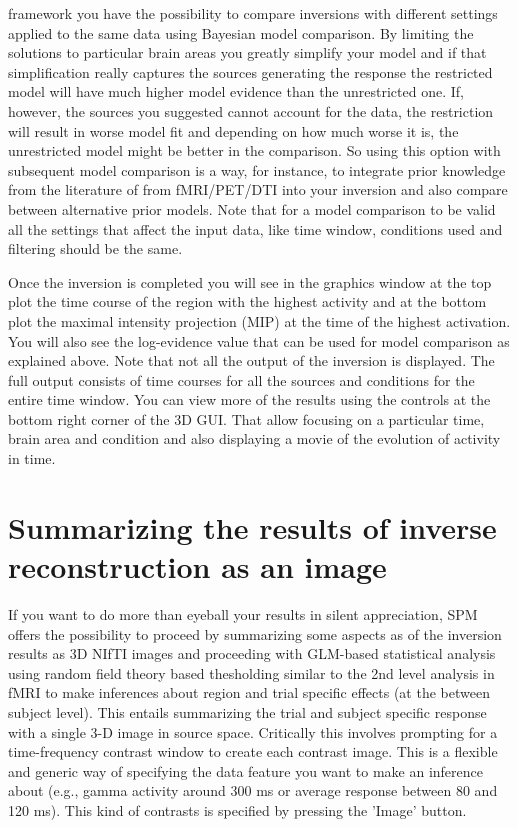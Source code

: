 framework you have the possibility to compare inversions with different settings applied to the same data using Bayesian model comparison. By limiting
the solutions to particular brain areas you greatly simplify your model and if that simplification really captures the sources generating the response
the restricted model will have much higher model evidence than the unrestricted one. If, however, the sources you suggested cannot account for the data,
the restriction will result in worse model fit and depending on how much worse it is, the unrestricted model might be better in the comparison. So using
this option with subsequent model comparison is a way, for instance, to integrate prior knowledge from the literature of from fMRI/PET/DTI into your
inversion and also compare between alternative prior models. Note that for a model comparison to be valid all the settings that affect the input data,
like time window, conditions used and filtering should be the same.

Once the inversion is completed you will see in the graphics window at the top plot the time course of the region with the highest activity and
at the bottom plot the maximal intensity projection (MIP) at the time of the highest activation. You will also see the log-evidence value that can
be used for model comparison as explained above. Note that not all the output of the inversion is displayed. The full output consists of time courses
for all the sources and conditions for the entire time window. You can view more of the results using the controls at the bottom right corner
of the 3D GUI. That allow focusing on a particular time, brain area and condition and also displaying a movie of the evolution of activity in time.

\section{Summarizing the results of inverse reconstruction as an image}
If you want to do more than eyeball your results in silent appreciation, SPM offers the possibility to proceed by summarizing some aspects
as of the inversion results as 3D NIfTI images and proceeding with GLM-based statistical analysis using random field theory based thesholding similar
to the 2nd level analysis in fMRI to make inferences about region and trial specific effects (at the between subject level).
This entails summarizing the trial and subject specific response with a single 3-D 
image in source space. Critically this involves prompting for a time-frequency contrast window to create each contrast image.
This is a flexible and generic way of specifying the data feature you want to make an inference about (e.g., gamma activity around 300 
ms or average response between 80 and 120 ms). This kind of contrasts is specified by pressing the 'Image' button. 


